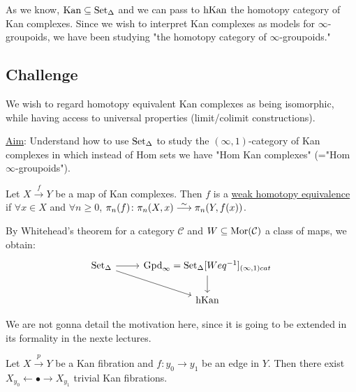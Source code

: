 As we know, $\operatorname{Kan} \subseteq \operatorname{Set}_{\Delta} $ and we can pass to $\operatorname{hKan}$ the homotopy category of Kan complexes. 
Since we wish to interpret Kan complexes as models for $\infty$-groupoids, we have been studying "the homotopy category of $\infty$-groupoids."

\subsection{Challenge}

We wish to regard homotopy equivalent Kan complexes as being isomorphic, while having access to universal properties (limit/colimit constructions).

\underline{Aim}: Understand how to use $\operatorname{Set}_{\Delta}$ to study the $(\infty,1)$-category of Kan complexes in which instead of Hom sets we have "Hom Kan complexes" (="Hom $\infty$-groupoids").

\begin{defi}
    Let $X \xrightarrow{f} Y$ be a map of Kan complexes. Then $f$ is a \underline{weak homotopy equivalence} if $\forall x \in X$ and $\forall n \geq 0$, $\pi_n(f) \colon  \pi_n(X,x) \isomorphism \pi_n(Y,f(x))$.
\end{defi}

\begin{rmk}
    By Whitehead's theorem for a category $\mathcal{C}$ and $W \subseteq \operatorname{Mor} (\mathcal{C})$ a class of maps, we obtain:
    \[
    \begin{tikzcd}
        \SetD
        \rar
        \ar[rd]
        &
        \Gpd_{\infty}= \SetD[Weq^{-1}]_{(\infty, 1) cat}
        \ar[d]
        \\
        &
        \hKan
    \end{tikzcd}
    \]
\end{rmk}

We are not gonna detail the motivation here, since it is going to be extended in its formality in the nexte lectures.

\begin{cor}
    Let $X \xrightarrow{p} Y$ be a Kan fibration and $f\colon y_0 \to y_1$ be an edge in $Y$.
    Then there exist $X_{y_0} \xleftarrow{} \bullet \to X_{y_1}$ trivial Kan fibrations.
\end{cor}

